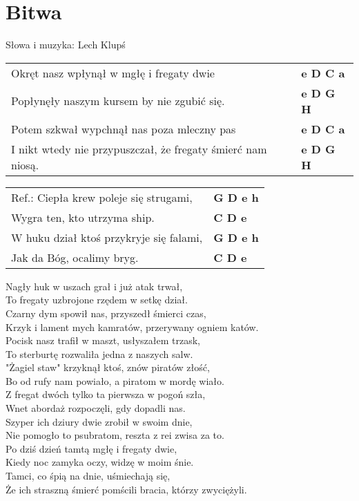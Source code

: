 \section{Bitwa}

Słowa i muzyka: Lech Klupś \\

\vspace{2em}
\begin{tabular}{@{}p{10cm}@{}l@{}}
Okręt nasz wpłynął w mgłę i fregaty dwie & \bfseries  e D C a \\
Popłynęły naszym kursem by nie zgubić się. & \bfseries  e D G H \\
Potem szkwał wypchnął nas poza mleczny pas & \bfseries  e D C a \\
I nikt wtedy nie przypuszczał, że fregaty śmierć nam niosą. & \bfseries  e D G H \\
\end{tabular}

\vspace{1em}
\begin{tabular}{@{}p{10cm}@{}l@{}}
Ref.: Ciepła krew poleje się strugami, & \bfseries  G D e h \\
Wygra ten, kto utrzyma ship. & \bfseries  C D e \\
W huku dział ktoś przykryje się falami, & \bfseries G D e h \\
Jak da Bóg, ocalimy bryg. & \bfseries  C D e \\
\end{tabular}

\vspace{1em}
Nagły huk w uszach grał i już atak trwał, \\
To fregaty uzbrojone rzędem w setkę dział. \\
Czarny dym spowił nas, przyszedł śmierci czas, \\
Krzyk i lament mych kamratów, przerywany ogniem katów. \\

\vspace{-1em}
Pocisk nasz trafił w maszt, usłyszałem trzask, \\
To sterburtę rozwaliła jedna z naszych salw. \\
"Żagiel staw" krzyknął ktoś, znów piratów złość, \\
Bo od rufy nam powiało, a piratom w mordę wiało. \\

Z fregat dwóch tylko ta pierwsza w pogoń szła, \\
Wnet abordaż rozpoczęli, gdy dopadli nas. \\
Szyper ich dziury dwie zrobił w swoim dnie, \\
Nie pomogło to psubratom, reszta z rei zwisa za to. \\

Po dziś dzień tamtą mgłę i fregaty dwie, \\
Kiedy noc zamyka oczy, widzę w moim śnie. \\
Tamci, co śpią na dnie, uśmiechają się, \\
Że ich straszną śmierć pomścili bracia, którzy zwyciężyli.